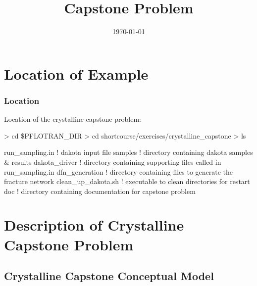 \documentclass{beamer}
\newcommand\bluecomment[1]{{{\color{blue} #1}}}
\begin{document}
\title{Capstone Problem}
\date{\today}


\section{Location of Example}

\begin{frame}\frametitle{Location}

Location of the crystalline capstone problem:

\begin{semiverbatim}
> cd \$PFLOTRAN_DIR
> cd shortcourse/exercises/crystalline_capstone
> ls

run_sampling.in    \bluecomment{! dakota input file }
samples            \bluecomment{! directory containing dakota 
                     samples \& results}
dakota_driver      \bluecomment{! directory containing supporting
                     files called in run_sampling.in}
dfn_generation     \bluecomment{! directory containing files to
                     generate the fracture network}
clean_up_dakota.sh \bluecomment{! executable to clean directories 
                     for restart }
doc                \bluecomment{! directory containing documentation
                     for capstone problem}
\end{semiverbatim}

\end{frame}

\section{Description of Crystalline Capstone Problem}

\subsection{Crystalline Capstone Conceptual Model}
\end{document}
